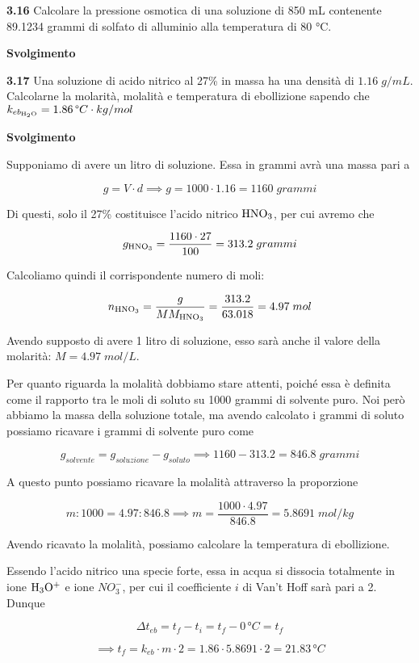 \vspace{0.2cm}\textbf{3.16} Calcolare la pressione osmotica di una soluzione di 850 mL contenente 89.1234 grammi di solfato di alluminio alla temperatura di 80 °C.

\vspace{0.2cm}\large\textbf{Svolgimento}\normalsize

\vspace{0.2cm}

\vspace{0.2cm}\textbf{3.17} Una soluzione di acido nitrico al 27\% in massa ha una densità di $1.16\;g/mL$. Calcolarne la molarità, molalità e temperatura di ebollizione sapendo che $k_{eb_{\rm H_2O}}=1.86\,\text{°}C \cdot kg/mol$

\vspace{0.2cm}\large\textbf{Svolgimento}\normalsize

\vspace{0.2cm}Supponiamo di avere un litro di soluzione. Essa in grammi avrà una massa pari a

$$g=V \cdot d \implies g=1000 \cdot 1.16 = 1160\;grammi$$

Di questi, solo il 27\% costituisce l'acido nitrico $\rm HNO_3$, per cui avremo che

$$g_{\rm HNO_3}=\frac{1160 \cdot 27}{100}=313.2\;grammi$$

Calcoliamo quindi il corrispondente numero di moli:

$$n_{\rm HNO_3}=\frac{g}{MM_{\rm HNO_3}}
=\frac{313.2}{63.018}=4.97\;mol$$

Avendo supposto di avere 1 litro di soluzione, esso sarà anche il valore della molarità: $M=4.97\;mol/L$.

\vspace{0.2cm}Per quanto riguarda la molalità dobbiamo stare attenti, poiché essa è definita come il rapporto tra le moli di soluto su 1000 grammi di solvente puro. Noi però abbiamo la massa della soluzione totale, ma avendo calcolato i grammi di soluto possiamo ricavare i grammi di solvente puro come

$$g_{solvente}=g_{soluzione} - g_{soluto}
\implies
1160 -313.2=846.8\;grammi$$

A questo punto possiamo ricavare la molalità attraverso la proporzione

$$m:1000=4.97:846.8
\implies
m=\frac{1000 \cdot 4.97}{846.8}=5.8691\;mol/kg$$

Avendo ricavato la molalità, possiamo calcolare la temperatura di ebollizione.

Essendo l'acido nitrico una specie forte, essa in acqua si dissocia totalmente in ione $\rm H_3O^+$ e ione $NO_3^-$, per cui il coefficiente $i$ di Van't Hoff sarà pari a 2. Dunque

$$\Delta t_{eb}=t_f - t_i=t_f - 0\,\text{°}C=t_f$$

$$\implies t_f=k_{eb} \cdot m \cdot 2
=1.86 \cdot 5.8691 \cdot 2=21.83\,\text{°}C$$